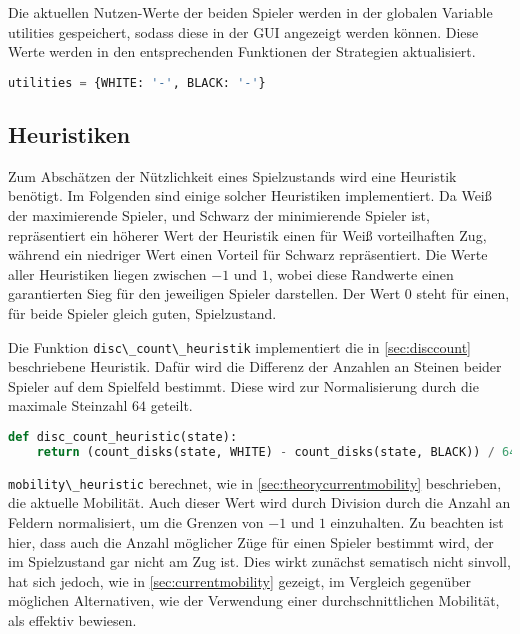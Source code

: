 Die aktuellen Nutzen-Werte der beiden Spieler werden in der globalen
Variable utilities gespeichert, sodass diese in der GUI angezeigt werden
können. Diese Werte werden in den entsprechenden Funktionen der
Strategien aktualisiert.

\begin{lstlisting}[language=Python]
utilities = {WHITE: '-', BLACK: '-'}
\end{lstlisting}

\hypertarget{heuristiken}{%
\subsection{Heuristiken}\label{heuristiken}}

Zum Abschätzen der Nützlichkeit eines Spielzustands wird eine Heuristik
benötigt. Im Folgenden sind einige solcher Heuristiken implementiert. Da
Weiß der maximierende Spieler, und Schwarz der minimierende Spieler ist,
repräsentiert ein höherer Wert der Heuristik einen für Weiß
vorteilhaften Zug, während ein niedriger Wert einen Vorteil für Schwarz
repräsentiert. Die Werte aller Heuristiken liegen zwischen \(-1\) und
\(1\), wobei diese Randwerte einen garantierten Sieg für den jeweiligen
Spieler darstellen. Der Wert \(0\) steht für einen, für beide Spieler
gleich guten, Spielzustand.

Die Funktion \passthrough{\lstinline!disc\_count\_heuristik!}
implementiert die in \ref{sec:disccount} beschriebene Heuristik. Dafür
wird die Differenz der Anzahlen an Steinen beider Spieler auf dem
Spielfeld bestimmt. Diese wird zur Normalisierung durch die maximale
Steinzahl \(64\) geteilt.

\begin{lstlisting}[language=Python]
def disc_count_heuristic(state):
    return (count_disks(state, WHITE) - count_disks(state, BLACK)) / 64
\end{lstlisting}

\passthrough{\lstinline!mobility\_heuristic!} berechnet, wie in
\ref{sec:theorycurrentmobility} beschrieben, die aktuelle Mobilität.
Auch dieser Wert wird durch Division durch die Anzahl an Feldern
normalisiert, um die Grenzen von \(-1\) und \(1\) einzuhalten. Zu
beachten ist hier, dass auch die Anzahl möglicher Züge für einen Spieler
bestimmt wird, der im Spielzustand gar nicht am Zug ist. Dies wirkt
zunächst sematisch nicht sinvoll, hat sich jedoch, wie in
\ref{sec:currentmobility} gezeigt, im Vergleich gegenüber möglichen
Alternativen, wie der Verwendung einer durchschnittlichen Mobilität, als
effektiv bewiesen.

